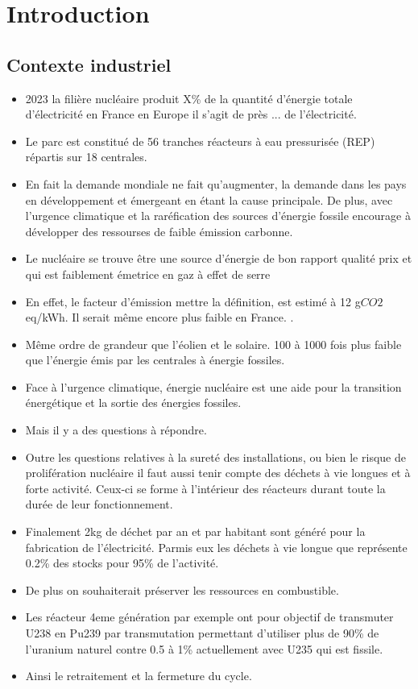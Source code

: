 
\chapter{Introduction}


\section{Contexte industriel}

\begin{itemize}
    \item 2023 la filière nucléaire produit X\% de la quantité d'énergie totale d'électricité en France en Europe il s'agit de près ... de l'électricité.
    \item Le parc est constitué de 56 tranches réacteurs à eau pressurisée (REP) répartis sur 18 centrales.
    \item En fait la demande mondiale ne fait qu'augmenter, la demande dans les pays en développement et émergeant en étant la cause principale. De plus, avec l'urgence climatique et la raréfication des sources d'énergie fossile encourage à développer des ressourses de faible émission carbonne.
    \item Le nucléaire se trouve être une source d'énergie de bon rapport qualité prix et qui est faiblement émetrice en gaz à effet de serre
    \item En effet, le facteur d'émission {mettre la définition}, est estimé à 12 g$CO2$eq/kWh. Il serait même encore plus faible en France. \cite{schlomer_technology-specific_nodate}.
    \item Même ordre de grandeur que l'éolien et le solaire. 100 à 1000 fois plus faible que l'énergie émis par les centrales à énergie fossiles.
    \item Face à l'urgence climatique, énergie nucléaire est une aide pour la transition énergétique et la sortie des énergies fossiles.
    \item Mais il y a des questions à répondre.
    \item Outre les questions relatives à la sureté des installations, ou bien le risque de prolifération nucléaire il faut aussi tenir compte des déchets à vie longues et à forte activité. Ceux-ci se forme à l'intérieur des réacteurs durant toute la durée de leur fonctionnement.
    \item Finalement 2kg de déchet par an et par habitant sont généré pour la fabrication de l'électricité. Parmis eux les déchets à vie longue que représente 0.2\% des stocks pour 95\% de l'activité.
    \item De plus on souhaiterait préserver les ressources en combustible.
    \item Les réacteur 4eme génération par exemple ont pour objectif de transmuter U238 en Pu239 par transmutation permettant d'utiliser plus de 90\% de l'uranium naturel contre 0.5 à 1\% actuellement avec U235 qui est fissile.
    \item Ainsi le retraitement et la fermeture du cycle.
\end{itemize}

